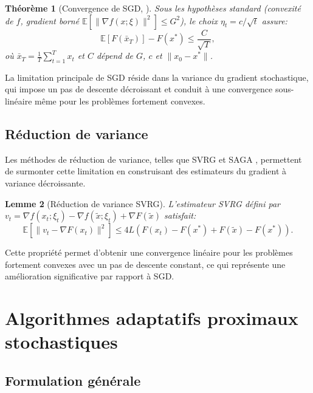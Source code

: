\documentclass[12pt,a4paper]{report}
\newtheorem{theoreme}{Th\'eor\`eme}[chapter]
\newtheorem{lemme}[theoreme]{Lemme}
\begin{document}
\begin{theoreme}[Convergence de SGD, \cite{nemirovski2009robust}]
Sous les hypoth\`eses standard (convexit\'e de $f$, gradient born\'e
$\mathbb{E}[\|\nabla f(x; \xi)\|^2] \leq G^2$), le choix
$\eta_t = c / \sqrt{t}$ assure:
\begin{equation}
  \mathbb{E}[F(\bar{x}_T)] - F(x^*) \leq \frac{C}{\sqrt{T}},
\end{equation}
o\`u $\bar{x}_T = \frac{1}{T} \sum_{t=1}^T x_t$ et $C$ d\'epend de
$G$, $c$ et $\|x_0 - x^*\|$.
\end{theoreme}

La limitation principale de SGD r\'eside dans la variance du gradient
stochastique, qui impose un pas de descente d\'ecroissant et conduit
\`a une convergence sous-lin\'eaire m\^eme pour les probl\`emes
fortement convexes.

\section{R\'eduction de variance}

Les m\'ethodes de r\'eduction de variance, telles que SVRG
\cite{johnson2013accelerating} et SAGA \cite{defazio2014saga},
permettent de surmonter cette limitation en construisant des estimateurs
du gradient \`a variance d\'ecroissante.

\begin{lemme}[R\'eduction de variance SVRG]
L'estimateur SVRG d\'efini par
$v_t = \nabla f(x_t; \xi_t) - \nabla f(\tilde{x}; \xi_t) + \nabla F(\tilde{x})$
satisfait:
\begin{equation}
  \mathbb{E}[\|v_t - \nabla F(x_t)\|^2] \leq 4L \left( F(x_t) - F(x^*)
    + F(\tilde{x}) - F(x^*) \right).
\end{equation}
\end{lemme}

Cette propri\'et\'e permet d'obtenir une convergence lin\'eaire pour
les probl\`emes fortement convexes avec un pas de descente constant,
ce qui repr\'esente une am\'elioration significative par rapport \`a SGD.


\chapter{Algorithmes adaptatifs proximaux stochastiques}

\section{Formulation g\'en\'erale}
\end{document}
